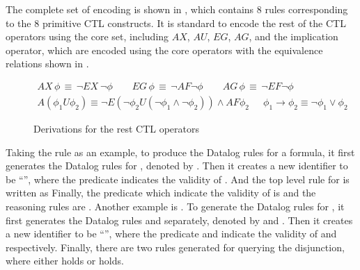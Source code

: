 \documentclass[acmsmall,screen,review,anonymous,nonacm]{acmart}
\begin{document}
The complete set of encoding is shown in 
, which contains 8 rules corresponding to the 8 primitive CTL constructs. 
It is standard to encode the rest of the CTL operators using the core set, including $AX$, $AU$, $EG$, $AG$, and the implication operator, which are encoded using the core operators with the equivalence relations shown in . 
{\begin{figure}[!h]
\vspace{-3mm}
\small
\centering
\begin{gather*}
AX\,\phi {\,\equiv\,} \neg EX~\neg  \phi 
\qquad  
EG\,\phi {\,\equiv\,} \neg AF \neg \phi 
\qquad  
AG\,\phi {\,\equiv\,} \neg EF \neg \phi 
\\ 
A(\phi_{1}U\phi_{2}) {\equiv} \neg E  (\neg \phi_{2} U (\neg \phi_{1} \land \neg \phi_{2})) {\land} AF\phi_{2} 
\quad\ \   
\phi_1{\rightarrow} \phi_2 {\equiv} \neg \phi_{1} {\vee} \phi_{2}
\end{gather*} 
\vspace{-3mm}
\caption{Derivations for the rest CTL operators}
\label{fig:ctl-datalog-translation-table-deriv}
\end{figure}}

Taking the rule  as an example, to produce the Datalog rules for a \code{\neg \phi} formula, it first generates the Datalog rules for \code{\phi}, denoted by \code{\drule^*}. Then it creates a new identifier  to be ``'', where the predicate  indicates the validity of \code{\phi}. 
And the top level rule for \code{\neg \phi} is written as \code{\drule^\prime{=}\nm_{\mathtt{new}}(S) \datalogarrow  \shortNeg\,  \nm(S).}
Finally, the predicate which indicate the validity of \code{\neg \phi} is \code{\nm_{\mathtt{new}}} and the reasoning rules are \code{\drule^* \concat [\drule^\prime]}. 
Another example is \code{[\CTLtoDKey\m{Disj}]}. 
To generate the Datalog rules for , it first generates the Datalog rules  and  separately, denoted by  and . 
Then it creates a new identifier \code{\nm_{\mathtt{new}}} to be 
\code{p_1\concat}``\code{\_OR\_}''\code{\concat p_2}, where the predicate  and  indicate the validity of  and  respectively. 
Finally, there are two rules generated for querying the disjunction, where either \code{\phi_1} holds or \code{\phi_2} holds. 
\end{document}
